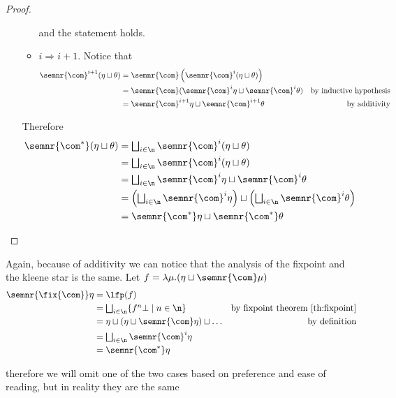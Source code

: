 \begin{proof}
\begin{itemize}
\begin{itemize}
\begin{equation*}
      \end{equation*}
      and the statement holds.
    \item \(i \Rightarrow i + 1\). Notice that
      \begin{align*}
        \semnr{\com}^{i+1}(\eta \sqcup \theta) & = \semnr{\com}\left(\semnr{\com}^i(\eta \sqcup \theta)\right) \\
                                               & = \semnr{\com}(\semnr{\com}^i\eta \sqcup \semnr{\com}^i\theta) & \text{by inductive hypothesis} \\
        & = \semnr{\com}^{i+1}\eta \sqcup \semnr{\com}^{i+1}\theta & \text{by additivity}
      \end{align*}
    \end{itemize}
    Therefore
    \begin{align*}
      \semnr{\com^*}(\eta\sqcup\theta) & = \textstyle \bigsqcup_{i\in\n} \semnr{\com}^i(\eta \sqcup \theta) \\
                                       & = \textstyle \bigsqcup_{i\in\n}\semnr{\com}^i(\eta \sqcup \theta) \\
                                       & = \textstyle \bigsqcup_{i\in\n}\semnr{\com}^i\eta \sqcup \semnr{\com}^i\theta \\
                                       & = \left(\textstyle \bigsqcup_{i\in\n} \semnr{\com}^i\eta\right) \sqcup \left(\textstyle \bigsqcup_{i\in\n} \semnr{\com}^i\theta\right) \\
      & = \semnr{\com^*} \eta \sqcup \semnr{\com^*}\theta
    \end{align*}
  \end{itemize}
\end{proof}

Again, because of additivity we can notice that the analysis of the
fixpoint and the kleene star is the same. Let
\(f = \lambda \mu . (\eta \sqcup \semnr{\com}\mu)\)
\begin{align*}
  \semnr{\fix{\com}}\eta & = \lfp(f) \\
                         & = \textstyle\bigsqcup_{i\in\n}\{f^n\bot \mid n \in \n\} & \text{by fixpoint theorem \ref{th:fixpoint}}\\
                         & = \eta \sqcup (\eta \sqcup \semnr{\com}\eta) \sqcup \dots & \text{by definition}\\
                         & = \textstyle\bigsqcup_{i\in\n}\semnr{\com}^i\eta \\
                         & = \semnr{\com^*}\eta
\end{align*}

therefore we will omit one of the two cases based on preference and
ease of reading, but in reality they are the same
